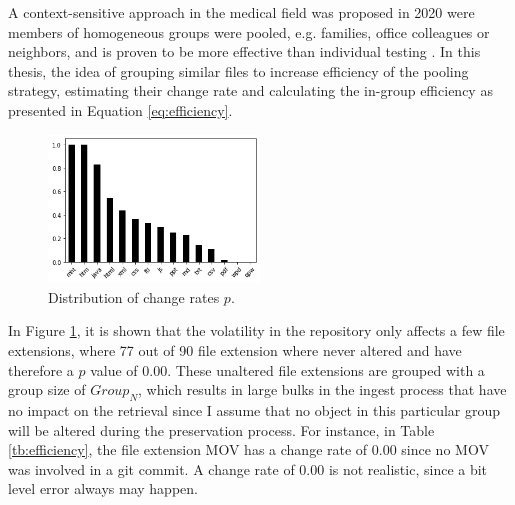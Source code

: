 A context-sensitive approach in the medical field was proposed in 2020 were members of homogeneous groups were pooled, e.g. families, office colleagues or neighbors, and is proven to be more effective than individual testing \cite[4]{deckert2020simulation}. In this thesis, the idea of grouping similar files to increase efficiency of the pooling strategy, estimating their change rate and calculating the in-group efficiency as presented in Equation \ref{eq:efficiency}.
\begin{figure}[t]%
    \centering
    \includegraphics[width=0.5\textwidth]{graphics/p-distribution.png}
    \caption{Distribution of change rates $p$.}\label{fig:p-distribution}
\end{figure}
In Figure \ref{fig:p-distribution}, it is shown that the volatility in the repository only affects a few file extensions, where 77 out of 90 file extension where never altered and have therefore a $p$ value of 0.00. These unaltered file extensions are grouped with a group size of $Group_N$, which results in large bulks in the ingest process that have no impact on the retrieval since I assume that no object in this particular group will be altered during the preservation process. For instance, in Table \ref{tb:efficiency}, the file extension MOV has a change rate of 0.00 since no MOV was involved in a git commit. A change rate of 0.00 is not realistic, since a bit level error always may happen.
